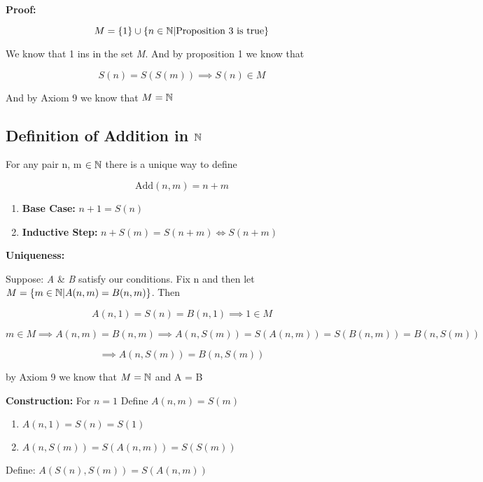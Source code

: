 \textbf{Proof:}

\[
	M = \{1\} \cup\{n \in \mathbb{N} | \text{Proposition 3 is true}\}
\]

We know that 1 ins in the set \emph{M}. And by proposition 1 we know that

\[
	S(n) = S(S(m)) \implies S(n) \in M
\]

And by Axiom 9 we know that \(M = \mathbb{N}\)

\subsection{Definition of Addition in \texorpdfstring{\(\mathbb{N}\)}{}}

For any pair n, m \(\in \mathbb{N}\) there is a unique way to define

\[
	\text{Add}(n , m) = n + m
\]

\begin{enumerate}
	
	\item \textbf{Base Case:} \(n + 1 = S(n)\)

	\item \textbf{Inductive Step:} \(n + S(m) = S(n + m) \iff S(n + m)\)

\end{enumerate}

\textbf{Uniqueness:} 

Suppose: \textit{A} \& \textit{B} satisfy our conditions. Fix n and then let \(M = \{ m \in \mathbb{N} | 
A(n,m) = B(n, m)\}\). Then

\[
	A(n,1) = S(n) = B(n,1) \implies 1 \in M
\]

\[
	m \in M \implies A(n, m) = B(n, m) \implies A(n, S(m)) = S(A(n, m)) = S(B(n, m)) = B(n, S(m))
\]

\[
	\implies A(n , S(m)) = B(n, S(m))
\]

by Axiom 9 we know that \(M = \mathbb{N}\) and A = B

\textbf{Construction:} For \(n = 1\) Define \(A(n, m) = S(m)\)

\begin{enumerate}
	
	\item \(A(n, 1) = S(n) = S(1)\)
	
	\item \(A(n, S(m)) = S(A(n, m)) = S(S(m))\)

\end{enumerate}

Define: \(A(S(n), S(m)) = S(A(n, m))\)

